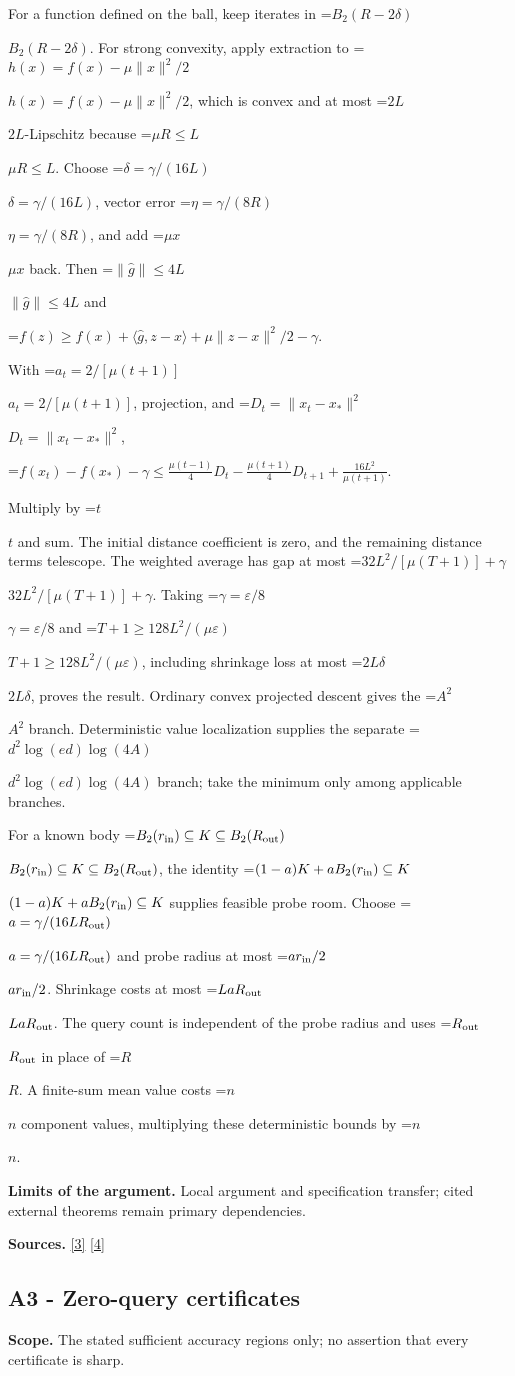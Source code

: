 \documentclass[10pt,a4paper]{article}
\newcommand{\AtlasMath}[1]{\par\begingroup\centering\setbox0=\hbox{$\displaystyle #1$}\ifdim\wd0>1.4\linewidth\typeout{ATLAS WIDE FORMULA: \the\wd0}\fi\ifdim\wd0>\linewidth\resizebox{\linewidth}{!}{\box0}\else\box0\fi\par\endgroup}
\newcommand{\AtlasInlineMath}[1]{\begingroup\setbox0=\hbox{$#1$}\ifdim\wd0>.4\linewidth\endgroup\AtlasMath{#1}\else\endgroup$#1$\fi}
\begin{document}
For a function defined on the ball, keep iterates in \AtlasInlineMath{B_2(R-2\delta)}. For strong convexity, apply extraction to \AtlasInlineMath{h(x)=f(x)-\mu\|x\|^2/2}, which is convex and at most \AtlasInlineMath{2L}-Lipschitz because \AtlasInlineMath{\mu R\le L}. Choose \AtlasInlineMath{\delta=\gamma/(16L)}, vector error \AtlasInlineMath{\eta=\gamma/(8R)}, and add \AtlasInlineMath{\mu x} back. Then \AtlasInlineMath{\|\widehat g\|\le4L} and

\AtlasMath{f(z)\ge f(x)+\langle\widehat g,z-x\rangle+\mu\|z-x\|^2/2-\gamma.}

With \AtlasInlineMath{a_t=2/[\mu(t+1)]}, projection, and \AtlasInlineMath{D_t=\|x_t-x_*\|^2},

\AtlasMath{f(x_t)-f(x_*)-\gamma\le\frac{\mu(t-1)}4D_t-\frac{\mu(t+1)}4D_{t+1}+\frac{16L^2}{\mu(t+1)}.}

Multiply by \AtlasInlineMath{t} and sum. The initial distance coefficient is zero, and the remaining distance terms telescope. The weighted average has gap at most \AtlasInlineMath{32L^2/[\mu(T+1)]+\gamma}. Taking \AtlasInlineMath{\gamma=\varepsilon/8} and \AtlasInlineMath{T+1\ge128L^2/(\mu\varepsilon)}, including shrinkage loss at most \AtlasInlineMath{2L\delta}, proves the result. Ordinary convex projected descent gives the \AtlasInlineMath{A^2} branch. Deterministic value localization supplies the separate \AtlasInlineMath{d^2\log(ed)\log(4A)} branch; take the minimum only among applicable branches.

For a known body \AtlasInlineMath{B_2(r_{\rm in})\subseteq K\subseteq B_2(R_{\rm out})}, the identity \AtlasInlineMath{(1-a)K+aB_2(r_{\rm in})\subseteq K} supplies feasible probe room. Choose \AtlasInlineMath{a=\gamma/(16LR_{\rm out})} and probe radius at most \AtlasInlineMath{ar_{\rm in}/2}. Shrinkage costs at most \AtlasInlineMath{LaR_{\rm out}}. The query count is independent of the probe radius and uses \AtlasInlineMath{R_{\rm out}} in place of \AtlasInlineMath{R}. A finite-sum mean value costs \AtlasInlineMath{n} component values, multiplying these deterministic bounds by \AtlasInlineMath{n}.

\textbf{Limits of the argument.} Local argument and specification transfer; cited external theorems remain primary dependencies.

\textbf{Sources.} \href{https://arxiv.org/html/2607.16558v2}{[3]} \href{https://www.mathnet.ru/php/archive.phtml?jrnid=mzm&option_lang=eng&paperid=1697&wshow=paper}{[4]}

\subsection{A3 - Zero-query certificates}
\textbf{Scope.} The stated sufficient accuracy regions only; no assertion that every certificate is sharp.
\end{document}
